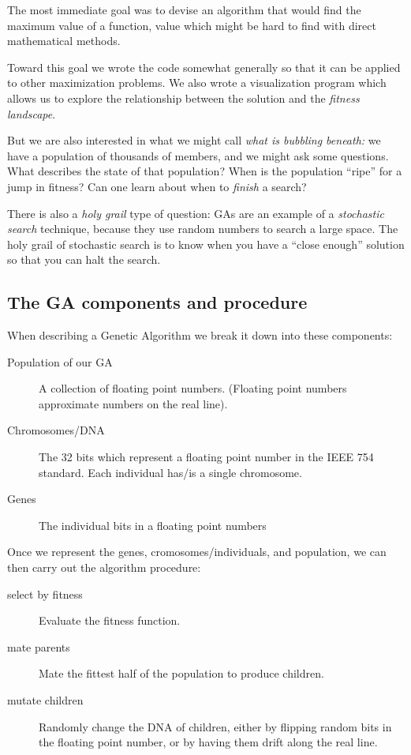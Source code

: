 \documentclass[11pt]{article}
\begin{document}
The most immediate goal was to devise an algorithm that would find the
maximum value of a function, value which might be hard to find with
direct mathematical methods.

Toward this goal we wrote the code somewhat generally so that it can
be applied to other maximization problems.  We also wrote a
visualization program which allows us to explore the relationship
between the solution and the \emph{fitness landscape}.

But we are also interested in what we might call \emph{what is
bubbling beneath:} we have a population of thousands of members, and
we might ask some questions.  What describes the state of that
population?  When is the population ``ripe'' for a jump in fitness?
Can one learn about when to \emph{finish} a search?

There is also a \emph{holy grail} type of question: GAs are an example
of a \emph{stochastic search} technique, because they use random
numbers to search a large space.  The holy grail of stochastic search
is to know when you have a ``close enough'' solution so that you can
halt the search.


\subsection{The GA components and procedure}

When describing a Genetic Algorithm we break it down into these
components:

\begin{description}
\item [Population of our GA] A collection of floating
  point numbers.  (Floating point numbers approximate numbers on the
  real line).\\
\item [Chromosomes/DNA] The 32 bits which represent a
  floating point number in the IEEE 754 standard.  Each individual
  has/is a single chromosome.
\item [Genes] The individual bits in a floating point numbers
\end{description}

Once we represent the genes, cromosomes/individuals, and population,
we can then carry out the algorithm procedure:

\begin{description}
\item [select by fitness] Evaluate the fitness function.
\item [mate parents] Mate the fittest half of the population to
  produce children.
\item [mutate children] Randomly change the DNA of children,
  either by flipping random bits in the floating point number,
  or by having them drift along the real line.
\end{description}
\end{document}
